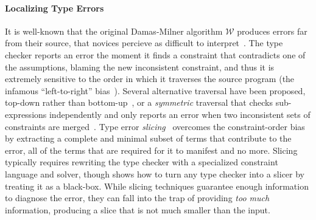 \paragraph{Localizing Type Errors}
It is well-known that the original Damas-Milner
algorithm $\mathcal{W}$ produces errors far
from their source, that novices percieve as
difficult to interpret~\citep{Wand1986-nw}.
%
%
The type checker reports an error the moment
it finds a constraint that contradicts one
of the assumptions, blaming the new inconsistent
constraint, and thus it is extremely sensitive
to the order in which it traverses the source
program (the infamous ``left-to-right''
bias~\citep{McAdam1998-ub}).
%
Several alternative traversal have been proposed,
\eg top-down rather than bottom-up~\citep{Lee1998-ys},
or a \emph{symmetric} traversal that checks
sub-expressions independently and only reports an
error when two inconsistent sets of constraints are
merged~\citep{McAdam1998-ub,Yang1999-yr}.
%
Type error \emph{slicing}~\citep{Haack2003-vc,Tip2001-qp,Rahli2010-ps}
overcomes the constraint-order bias by extracting a
complete and minimal subset
of terms that contribute to the error, \ie all of the
terms that are required for it to manifest and no more.
%
Slicing typically requires rewriting the type checker with a
specialized constraint language and solver, though
\citet{Schilling2011-yf} shows how to turn any type checker into a
slicer by treating it as a black-box.
%
While slicing techniques guarantee enough information to diagnose the
error, they can fall into the trap of providing \emph{too much}
information, producing a slice that is not much smaller than
the input. %

